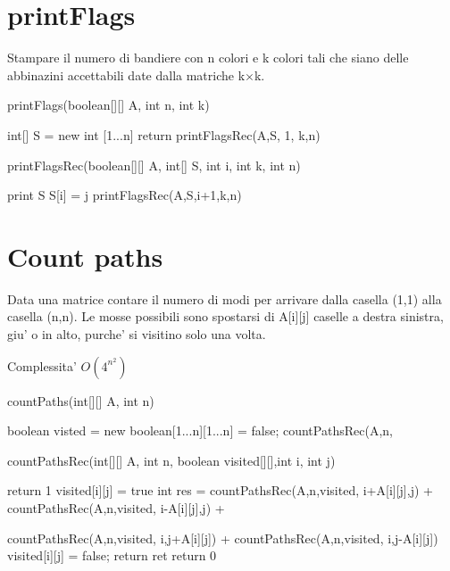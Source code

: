 \documentclass[oneside]{book}
\begin{document}
\section{printFlags}
Stampare il numero di bandiere con n colori e k colori tali che siano delle abbinazini accettabili date dalla matriche k$\times$k.

\begin{algorithm}
\caption{printFlags(boolean[][] A, int n, int k)\label{alg:cap}}
\begin{algorithmic}
\State int[] S = new int [1...n]
\State return printFlagsRec(A,S, 1, k,n)
\end{algorithmic}
\end{algorithm}

\begin{algorithm}
\caption{printFlagsRec(boolean[][] A, int[] S, int i, int k, int n)\label{alg:cap}}
\begin{algorithmic}
\If{}
	\State print S
\Else
		\If{i == 1 \textbf{or} A[j][S[i-1]}
			\State S[i] = j
			printFlagsRec(A,S,i+1,k,n)
		\EndIf

	\EndFor
\EndIf

\end{algorithmic}
\end{algorithm}
\newpage
\section{Count paths}
Data una matrice contare il numero di modi per arrivare dalla casella (1,1) alla casella (n,n). Le mosse possibili sono spostarsi di A[i][j] caselle a destra sinistra, giu' o in alto, purche' si visitino solo una volta.

Complessita' $O(4^{n^2})$

\begin{algorithm}
\caption{countPaths(int[][] A, int n)}
\begin{algorithmic}
\State boolean visted = new boolean[1...n][1...n] = false;
\State countPathsRec(A,n,
\end{algorithmic}
\end{algorithm}


\begin{algorithm}
\caption{countPathsRec(int[][] A, int n, boolean visited[][],int i, int j)}
\begin{algorithmic}
	return 1
	\State visited[i][j] = true
	\State int res = 
	\State countPathsRec(A,n,visited, i+A[i][j],j) + 
	\State countPathsRec(A,n,visited, i-A[i][j],j) + 
	
	\State countPathsRec(A,n,visited, i,j+A[i][j]) + 
	\State countPathsRec(A,n,visited, i,j-A[i][j]) 
	\State visited[i][j] = false;
	\State return ret
\Else
	\State return 0
\EndIf
\end{algorithmic}
\end{algorithm}
\newpage
\end{document}

